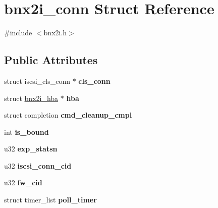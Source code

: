 \hypertarget{structbnx2i__conn}{
\section{bnx2i\_\-conn Struct Reference}
\label{structbnx2i__conn}
}


{\ttfamily \#include $<$bnx2i.h$>$}

\subsection*{Public Attributes}
\begin{DoxyCompactItemize}
\item 
\hypertarget{structbnx2i__conn_a74b681ce278487fbf7d3f3fcac47b75a}{
struct iscsi\_\-cls\_\-conn $\ast$ {\bfseries cls\_\-conn}}
\label{structbnx2i__conn_a74b681ce278487fbf7d3f3fcac47b75a}

\item 
\hypertarget{structbnx2i__conn_a17be187deebde05dbd1a6ebb0db77a33}{
struct \hyperlink{structbnx2i__hba}{bnx2i\_\-hba} $\ast$ {\bfseries hba}}
\label{structbnx2i__conn_a17be187deebde05dbd1a6ebb0db77a33}

\item 
\hypertarget{structbnx2i__conn_a7db57d7ac876d29011fe8ce73a70a380}{
struct completion {\bfseries cmd\_\-cleanup\_\-cmpl}}
\label{structbnx2i__conn_a7db57d7ac876d29011fe8ce73a70a380}

\item 
\hypertarget{structbnx2i__conn_ac4156cd1dad044451d0fd2ec74d39402}{
int {\bfseries is\_\-bound}}
\label{structbnx2i__conn_ac4156cd1dad044451d0fd2ec74d39402}

\item 
\hypertarget{structbnx2i__conn_a88a4d680142f7ad7008e1f524eeaeb14}{
u32 {\bfseries exp\_\-statsn}}
\label{structbnx2i__conn_a88a4d680142f7ad7008e1f524eeaeb14}

\item 
\hypertarget{structbnx2i__conn_ac1e18a9193da60ef27978c7070044eb6}{
u32 {\bfseries iscsi\_\-conn\_\-cid}}
\label{structbnx2i__conn_ac1e18a9193da60ef27978c7070044eb6}

\item 
\hypertarget{structbnx2i__conn_a20bb4e86431561311b0fc27ed5a9f309}{
u32 {\bfseries fw\_\-cid}}
\label{structbnx2i__conn_a20bb4e86431561311b0fc27ed5a9f309}

\item 
\hypertarget{structbnx2i__conn_a33ee22579ee0a05bfb3bca4053fa5071}{
struct timer\_\-list {\bfseries poll\_\-timer}}
\label{structbnx2i__conn_a33ee22579ee0a05bfb3bca4053fa5071}


\end{DoxyCompactItemize}
